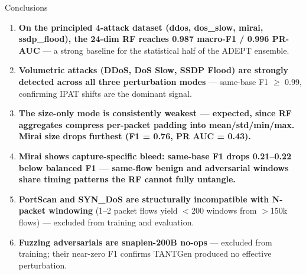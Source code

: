 \documentclass[10pt,aspectratio=169]{beamer}
\newcommand{\good}[1]{\textcolor{good}{\textbf{#1}}}
\newcommand{\warn}[1]{\textcolor{warn}{\textbf{#1}}}
\newcommand{\bad}[1]{\textcolor{bad}{\textbf{#1}}}
\begin{document}
\begin{frame}{Conclusions}
\begin{enumerate}
  \item \good{On the principled 4-attack dataset (ddos, dos\_slow, mirai,
        ssdp\_flood), the 24-dim RF reaches 0.987 macro-F1 / 0.996 PR-AUC}
        --- a strong baseline for the statistical half of the ADEPT ensemble.
  \item \good{Volumetric attacks (DDoS, DoS Slow, SSDP Flood) are
        strongly detected across all three perturbation modes} ---
        same-base F1 $\geq$ 0.99, confirming IPAT shifts are the dominant signal.
  \item \warn{The size-only mode is consistently weakest --- expected,
        since RF aggregates compress per-packet padding into mean/std/min/max.
        Mirai size drops furthest (F1 = 0.76, PR AUC = 0.43).}
  \item \warn{Mirai shows capture-specific bleed: same-base F1 drops
        0.21--0.22 below balanced F1 --- same-flow benign and adversarial
        windows share timing patterns the RF cannot fully untangle.}
  \item \bad{PortScan and SYN\_DoS are structurally incompatible with
        N-packet windowing} (1--2 packet flows yield $<$200 windows from
        $>$150k flows) --- excluded from training and evaluation.
  \item \bad{Fuzzing adversarials are snaplen-200B no-ops} ---
        excluded from training; their near-zero F1 confirms
        TANTGen produced no effective perturbation.
\end{enumerate}
\end{frame}
\end{document}
